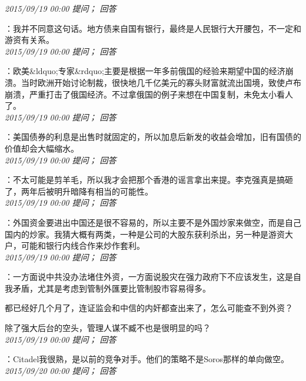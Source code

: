 \documentclass[twocolumn]{ctexart}
\begin{document}
\textit{\hfill\noindent\small 2015/09/19 00:00 提问； 回答}

：我并不同意这句话。地方债来自国有银行，最终是人民银行大开腰包，不一定和游资有关系。\\

\textit{\hfill\noindent\small 2015/09/19 00:00 提问； 回答}

：欧美\&ldquo;专家\&rdquo;主要是根据一年多前俄国的经验来期望中国的经济崩溃。当时欧洲开始讨论制裁，很快地几千亿美元的寡头财富就流出国境，致使卢布崩溃，严重打击了俄国经济。不过拿俄国的例子来想在中国复制，未免太小看人了。\\

\textit{\hfill\noindent\small 2015/09/19 00:00 提问； 回答}

：美国债券的利息是出售时就固定的，所以加息后新发的收益会增加，旧有国债的价值却会大幅缩水。\\

\textit{\hfill\noindent\small 2015/09/19 00:00 提问； 回答}

：不太可能是剪羊毛，所以我才会把那个香港的谣言拿出来提。李克强真是搞砸了，两年后被明升暗降有相当的可能性。\\

\textit{\hfill\noindent\small 2015/09/19 00:00 提问； 回答}

：外国资金要进出中国还是很不容易的，所以主要不是外国炒家来做空，而是自己国内的炒家。我猜大概有两类，一种是公司的大股东获利杀出，另一种是游资大户，可能和银行内线合作来炒作套利。\\

\textit{\hfill\noindent\small 2015/09/19 00:00 提问； 回答}

：一方面说中共没办法堵住外资，一方面说股灾在强力政府下不应该发生，这是自我矛盾，尤其是考虑到管制外匯要比管制股市容易得多。

都已经好几个月了，连证监会和中信的内奸都查出来了，怎么可能查不到外资？

除了强大后台的空头，管理人谋不臧不也是很明显的吗？\\

\textit{\hfill\noindent\small 2015/09/19 00:00 提问； 回答}

：Citadel我很熟，是以前的竞争对手。他们的策略不是Soros那样的单向做空。\\

\textit{\hfill\noindent\small 2015/09/20 00:00 提问； 回答}
\end{document}
